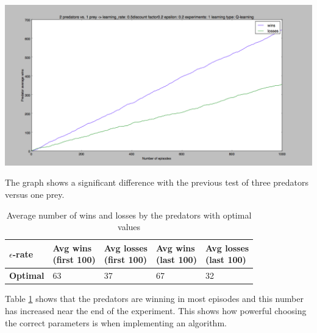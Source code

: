 \begin{center}
	\includegraphics[scale=0.3]{q_learning_optimal_1000times5}
	\label{graph:optimal_q_graph}
\end{center}

The graph shows a significant difference with the previous test of three predators versus one prey. 

\begin{table}[H]
\begin{center}
\begin{tabular}{| l | l | l | l | l |}
\hline
\parbox{2cm}{\textbf{$\epsilon$-rate}} & \parbox{2cm}{\textbf{Avg wins \\ (first 100)}} & \parbox{2cm}{\textbf{Avg losses \\ (first 100)}} & \parbox{2cm}{\textbf{Avg wins \\ (last 100)}} & \parbox{2cm}{\textbf{Avg losses \\ (last 100)}} \\
\hline
\textbf{Optimal} & 63 & 37 & 67 & 32 \\
\hline
\end{tabular}
\caption{Average number of wins and losses by the predators with optimal values}
\label{table:optimal_q_table}
\end{center}
\end{table}

Table \ref{table:optimal_q_table} shows that the predators are winning in most episodes and this number has increased near the end of the experiment. This shows how powerful choosing the correct parameters is when implementing an algorithm.
